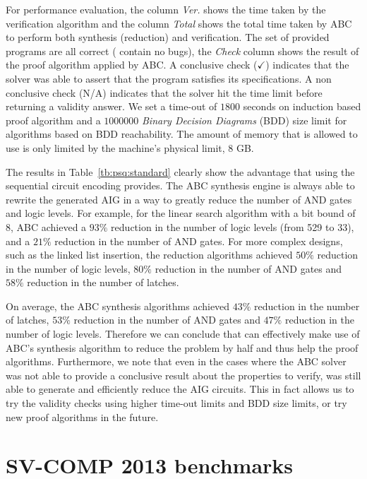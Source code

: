For performance evaluation, the column {\em Ver.} shows the 
time taken by the verification algorithm and the column {\em Total} 
shows the total time taken by ABC to perform both synthesis (reduction)
and verification. 
The set of provided programs are all correct (\ie
contain no bugs), the {\em Check} column shows the result of the 
proof algorithm applied by ABC. A conclusive check ($\checkmark$) 
indicates that the solver was able to assert that the program
satisfies its specifications. A non conclusive check (N/A) 
indicates that the solver hit the time limit before returning 
a validity answer. We set a time-out of $1800$ seconds on induction based
proof algorithm and a $1000000$ {\em Binary Decision Diagrams} 
(BDD) size limit for algorithms based on 
BDD reachability. The amount of memory that \mytool{} 
is allowed to use is only limited by the machine's physical limit, \ie $8$ GB.

The results in Table~\ref{tb:psq:standard} clearly show the advantage that
using the sequential circuit encoding provides. The ABC synthesis engine is always
able to rewrite the generated AIG in a way to greatly reduce the number of AND gates
and logic levels. For example, for the linear search algorithm with a bit bound of 
8, ABC achieved a $93\%$ reduction in the number of logic levels (from 529 to 33), 
and a $21\%$ reduction in the number of AND gates. For more complex designs,
such as the linked list insertion, the reduction algorithms achieved $50\%$
reduction in the number of logic levels, 
$80\%$ reduction in the number of AND gates 
and $58\%$ reduction in the number of latches. 

On average, the ABC synthesis algorithms achieved $43\%$ reduction in the 
number of latches, $53\%$ reduction in the number of AND gates and 
$47\%$ reduction in the number of logic levels. Therefore we can conclude
that \mytool{} can effectively make use of ABC's synthesis algorithm to 
reduce the problem by half and thus help the proof algorithms. Furthermore, 
we note that even in the cases where the ABC solver was not able to 
provide a conclusive result about the properties to verify, \mytool{} was
still able to generate and efficiently reduce the AIG circuits. This in fact
allows us to try the validity checks using higher time-out limits and BDD size limits, 
or  try new proof algorithms in the future.

\section{SV-COMP 2013 benchmarks}
\label{chap:res:svcompbench}
